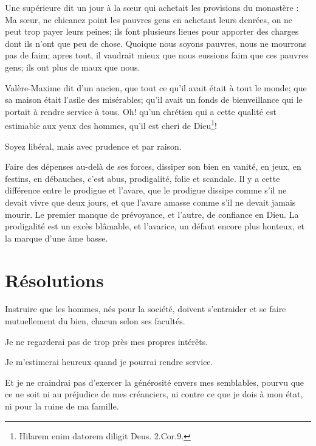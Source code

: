 \documentclass[instructions.tex]{subfiles}
\begin{document}
Une supérieure dit un jour à la sœur qui achetait les provisions du monastère : Ma sœur, ne chicanez point les pauvres gens en achetant leurs denrées, on ne peut trop payer leurs peines; ils font plusieurs lieues pour apporter des charges dont ils n'ont que peu de chose. Quoique nous soyons pauvres, nous ne mourrons pas de faim; apres tout, il vaudrait mieux que nous eussions faim que ces pauvres gens; ils ont plus de maux que nous.
 
Valère-Maxime dit d'un ancien, que tout ce qu'il avait était à tout le monde; que sa maison était l'asile des misérables; qu'il avait un fonds de bienveillance qui le portait à rendre service à tous. Oh! qu'un chrétien qui a cette qualité est estimable aux yeux des hommes, qu'il est cheri de Dieu\footnote{Hilarem enim datorem diligit Deus. 2.Cor.9.}!
 
\tertio Soyez libéral, mais avec prudence et par raison.
 
Faire des dépenses au-delà de ses forces, dissiper son bien en vanité, en jeux, en festins, en débauches, c'est abus, prodigalité, folie et scandale. Il y a cette différence entre le prodigue et l'avare, que le prodigue dissipe comme s'il ne devait vivre que deux jours, et que l'avare amasse comme s'il ne devait jamais mourir. Le premier manque de prévoyance, et l'autre, de confiance en Dieu. La prodigalité est un excès blâmable, et l'avarice, un défaut encore plus honteux, et la marque d'une âme basse.
 
\section{Résolutions}
 
\primo Instruire que les hommes, nés pour la société, doivent s'entraider et se faire mutuellement du bien, chacun selon ses facultés.
 
\secundo Je ne regarderai pas de trop près mes propres intérêts.
 
\tertio Je m'estimerai heureux quand je pourrai rendre service.
 
\quarto Et je ne craindrai pas d'exercer la générosité envers mes semblables, pourvu que ce ne soit ni au préjudice de mes créanciers, ni contre ce que je dois à mon état, ni pour la ruine de ma famille.
 
 
\end{document}
